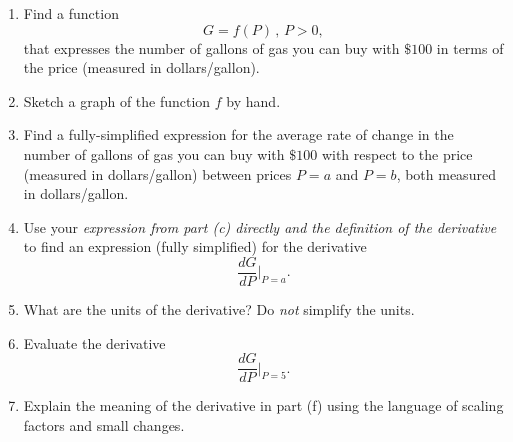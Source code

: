 \documentclass{ximera}
\begin{document}
\begin{question}  \label{Qldfer33}
\begin{enumerate}
\item Find a function
\[
   G = f(P) \, , \, P>0 ,
\]
that expresses the number of gallons of gas you can buy with $\$100$ in terms of the price (measured in dollars/gallon).

\item Sketch a graph of the function $f$ by hand.

\item Find a fully-simplified expression for the average rate of change in the number of gallons of gas you can buy with $\$100$ with respect to the price (measured in dollars/gallon) between prices $P=a$ and $P=b$, both measured in dollars/gallon.

\item Use your \emph{expression from part (c) directly and the definition of the derivative} to find an expression (fully simplified) for the derivative
\[
   \frac{dG}{dP}\Big|_{P=a} .
\]

\item What are the units of the derivative? Do \emph{not} simplify the units.

\item Evaluate the derivative
\[
  \frac{dG}{dP}\Big|_{P=5} .
\]

\item  Explain the meaning of the derivative in part (f) using the language of scaling factors and small changes.
\end{enumerate}
\end{question}
\end{document}
